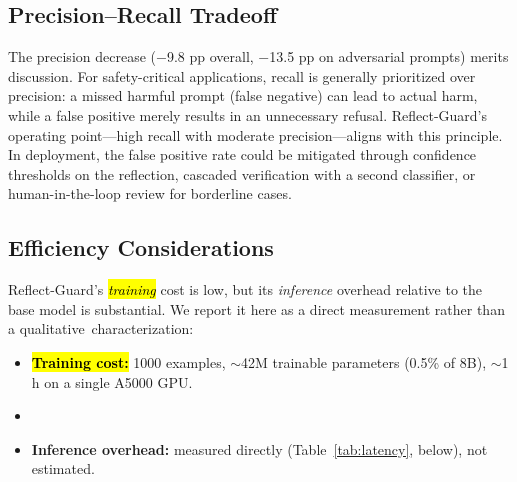 \documentclass[superintelligence,article,accept,moreauthors]{Definitions/mdpi}
\begin{document}
\subsection{Precision--Recall Tradeoff}

The precision decrease ($-$9.8 pp overall, $-$13.5 pp on adversarial prompts) merits discussion. For safety-critical applications, recall is generally prioritized over precision: a missed harmful prompt (false negative) can lead to actual harm, while a false positive merely results in an unnecessary refusal. Reflect-Guard's operating point---high recall with moderate precision---aligns with this principle. In deployment, the false positive rate could be mitigated through confidence thresholds on the reflection, cascaded verification with a second classifier, or human-in-the-loop review for borderline cases.

\subsection{Efficiency Considerations}
\label{sec:efficiency}

Reflect-Guard's \emph{\hl{training} %
} cost is low, but its \emph{inference} overhead relative to the base model is substantial. We report it here as a direct measurement rather than a \mbox{qualitative characterization:}
\begin{itemize}[leftmargin=*, nosep]
  \item \textbf{\hl{Training cost:} %
} 1000 examples, $\sim$42M trainable parameters (0.5\% of 8B), $\sim$1 h on a single A5000 GPU.
  \item {}
  \item \textbf{Inference overhead:} measured directly (Table~\ref{tab:latency}, below), not estimated.
\end{itemize}
\end{document}
